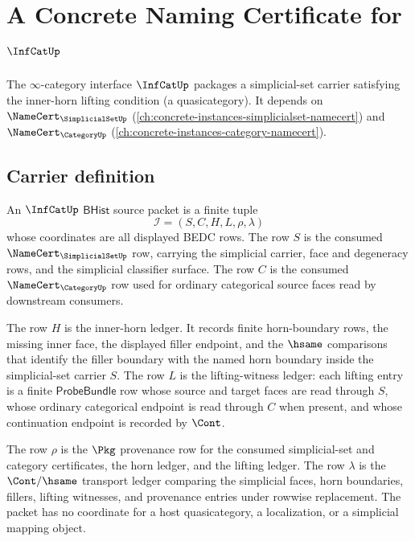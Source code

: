 \chapter{A Concrete Naming Certificate for $\InfCatUp$}
\label{ch:concrete-instances-infcat-namecert}

The $\infty$-category interface $\InfCatUp$ packages a simplicial-set carrier satisfying the inner-horn lifting condition (a quasicategory). It depends on $\NameCert_{\SimplicialSetUp}$ (\autoref{ch:concrete-instances-simplicialset-namecert}) and $\NameCert_{\CategoryUp}$ (\autoref{ch:concrete-instances-category-namecert}).

\section{Carrier definition}
\label{sec:infcat-carrier}

\begin{definition}
\label{def:infcat-bhist-source-packet}
An $\InfCatUp$ $\mathsf{BHist}$ source packet is a finite tuple
$$
\mathcal{I}=(S,C,H,L,\rho,\lambda)
$$
whose coordinates are all displayed BEDC rows. The row $S$ is the consumed
$\NameCert_{\SimplicialSetUp}$ row, carrying the simplicial carrier, face and
degeneracy rows, and the simplicial classifier surface. The row $C$ is the
consumed $\NameCert_{\CategoryUp}$ row used for ordinary categorical source
faces read by downstream consumers.

The row $H$ is the inner-horn ledger. It records finite horn-boundary rows,
the missing inner face, the displayed filler endpoint, and the $\hsame$
comparisons that identify the filler boundary with the named horn boundary
inside the simplicial-set carrier $S$. The row $L$ is the lifting-witness
ledger: each lifting entry is a finite $\mathsf{ProbeBundle}$ row whose source
and target faces are read through $S$, whose ordinary categorical endpoint is
read through $C$ when present, and whose continuation endpoint is recorded by
$\Cont$.

The row $\rho$ is the $\Pkg$ provenance row for the consumed simplicial-set
and category certificates, the horn ledger, and the lifting ledger. The row
$\lambda$ is the $\Cont/\hsame$ transport ledger comparing the simplicial
faces, horn boundaries, fillers, lifting witnesses, and provenance entries
under rowwise replacement. The packet has no coordinate for a host
quasicategory, a localization, or a simplicial mapping object.
\end{definition}

